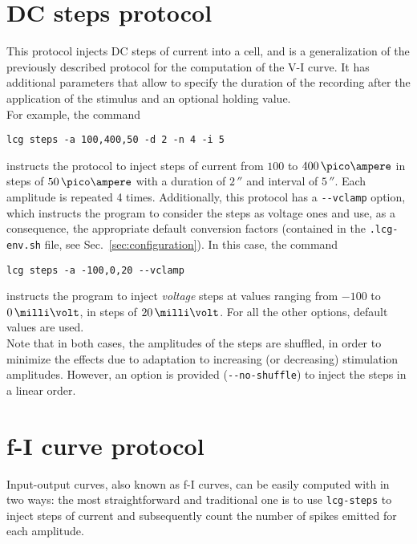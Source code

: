 \section{DC steps protocol}
This protocol injects DC steps of current into a cell, and is a
generalization of the previously described protocol for the
computation of the V-I curve. It has additional parameters that allow
to specify the duration of the recording after the application of the
stimulus and an optional holding value.\\
For example, the command
\begin{lstlisting}
lcg steps -a 100,400,50 -d 2 -n 4 -i 5
\end{lstlisting}
instructs the protocol to inject steps of current from $100$ to
$400\,\pico\ampere$ in steps of $50\,\pico\ampere$ with a duration of
$2\,\second$ and interval of $5\,\second$. Each amplitude is repeated
4 times. Additionally, this protocol has a \verb+--vclamp+
option, which instructs the program to consider the steps as voltage ones
and use, as a consequence, the appropriate default conversion factors
(contained in the \verb+.lcg-env.sh+ file, see
Sec.~\ref{sec:configuration}). In this case, the command
\begin{lstlisting}
lcg steps -a -100,0,20 --vclamp
\end{lstlisting}
instructs the program to inject \emph{voltage} steps at values ranging from
$-100$ to $0\,\milli\volt$, in steps of $20\,\milli\volt$. For all the
other options, default values are used.\\
Note that in both cases, the amplitudes of the steps are shuffled, in
order to minimize the effects due to adaptation to increasing (or
decreasing) stimulation amplitudes. However, an option is provided
(\verb+--no-shuffle+) to inject the steps in a linear order.

\section{f-I curve protocol}
Input-output curves, also known as f-I curves, can be easily computed
with \progname in two ways: the most straightforward and traditional
one is to use \verb+lcg-steps+ to inject steps of current and
subsequently count the number of spikes emitted for each amplitude.

